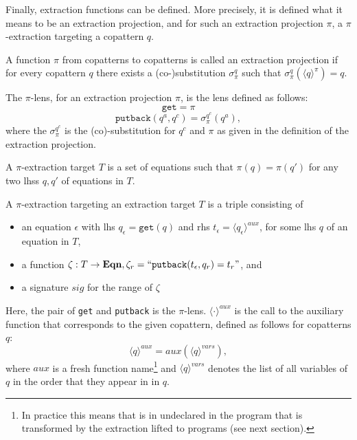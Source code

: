 Finally, extraction functions can be defined. More precisely, it is defined what it means to be an extraction projection, and for such an extraction projection $\pi$, a $\pi$-extraction targeting a copattern $q$.

\begin{definition}
A function $\pi$ from copatterns to copatterns is called an extraction projection if for every copattern $q$ there exists a (co-)substitution $\sigma^q_\pi$ such that $\sigma^q_\pi(\langle q \rangle^\pi) = q$.
\end{definition}

\begin{definition}[$\pi$-lens]
The $\pi$-lens, for an extraction projection $\pi$, is the lens defined as follows:
\[
\mathtt{get} = \pi
\]
\[
\mathtt{putback}(q^a, q^c) = \sigma^{q^c}_\pi(q^a),
\]
where the $\sigma^{q^c}_\pi$ is the (co)-substitution for $q^c$ and $\pi$ as given in the definition of the extraction projection.
\end{definition}

\begin{definition}
A $\pi$-extraction target $T$ is a set of equations such that $\pi(q) = \pi(q')$ for any two lhss $q, q'$ of equations in $T$.
\end{definition}

\begin{definition}
A $\pi$-extraction targeting an extraction target $T$ is a triple consisting of
\begin{itemize}
\item an equation $\epsilon$ with lhs $q_\epsilon = \mathtt{get}(q)$ and rhs $t_\epsilon = \langle q_\epsilon \rangle^{aux}$, for some lhs $q$ of an equation in $T$,
\item a function $\zeta: T \to \mathbf{Eqn}, \zeta_r = ``\mathtt{putback}(t_\epsilon, q_r) = t_r  "$, and
\item a signature $sig$ for the range of $\zeta$
\end{itemize}

Here, the pair of \texttt{get} and \texttt{putback} is the $\pi$-lens. $\langle \cdot \rangle^{aux}$ is the call to the auxiliary function that corresponds to the given copattern, defined as follows for copatterns $q$:
\[
\langle q \rangle^{aux} = aux(\langle q \rangle^{vars}),
\]
where $aux$ is a fresh function name\footnote{In practice this means that is in undeclared in the program that is transformed by the extraction lifted to programs (see next section).} and $\langle q \rangle^{vars}$ denotes the list of all variables of $q$ in the order that they appear in in $q$.
\end{definition}

